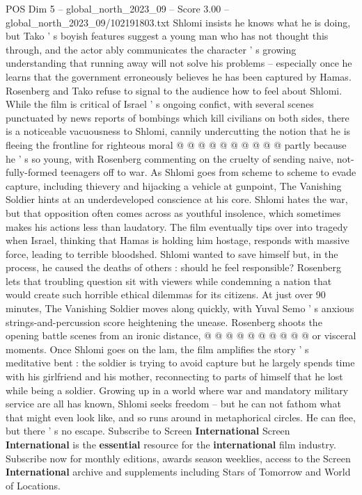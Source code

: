 \begin{textsample}{POS Dim 5 – global\_north\_2023\_09 – Score 3.00 – global\_north\_2023\_09/102191803.txt}
Shlomi insists he knows what he is doing, but Tako ' s boyish features suggest a young man who has not thought this through, and the actor ably communicates the character ' s growing understanding that running away will not solve his problems -- especially once he learns that the government erroneously believes he has been captured by Hamas.
Rosenberg and Tako refuse to signal to the audience how to feel about Shlomi.
While the film is critical of Israel ' s ongoing confict, with several scenes punctuated by news reports of bombings which kill civilians on both sides, there is a noticeable vacuousness to Shlomi, cannily undercutting the notion that he is fleeing the frontline for righteous moral @ @ @ @ @ @ @ @ @ @ partly because he ' s so young, with Rosenberg commenting on the cruelty of sending naive, not-fully-formed teenagers off to war.
As Shlomi goes from scheme to scheme to evade capture, including thievery and hijacking a vehicle at gunpoint, The Vanishing Soldier hints at an underdeveloped conscience at his core.
Shlomi hates the war, but that opposition often comes across as youthful insolence, which sometimes makes his actions less than laudatory.
The film eventually tips over into tragedy when Israel, thinking that Hamas is holding him hostage, responds with massive force, leading to terrible bloodshed.
Shlomi wanted to save himself but, in the process, he caused the deaths of others : should he feel responsible?
Rosenberg lets that troubling question sit with viewers while condemning a nation that would create such horrible ethical dilemmas for its citizens.
At just over 90 minutes, The Vanishing Soldier moves along quickly, with Yuval Semo ' s anxious strings-and-percussion score heightening the unease.
Rosenberg shoots the opening battle scenes from an ironic distance, @ @ @ @ @ @ @ @ @ @ or visceral moments.
Once Shlomi goes on the lam, the film amplifies the story ' s meditative bent : the soldier is trying to avoid capture but he largely spends time with his girlfriend and his mother, reconnecting to parts of himself that he lost while being a soldier.
Growing up in a world where war and mandatory military service are all has known, Shlomi seeks freedom -- but he can not fathom what that might even look like, and so runs around in metaphorical circles.
He can flee, but there ' s no escape.
Subscribe to Screen \textbf{International} Screen \textbf{International} is the \textbf{essential} resource for the \textbf{international} film industry.
Subscribe now for monthly editions, awards season weeklies, access to the Screen \textbf{International} archive and supplements including Stars of Tomorrow and World of Locations.

\end{textsample}
